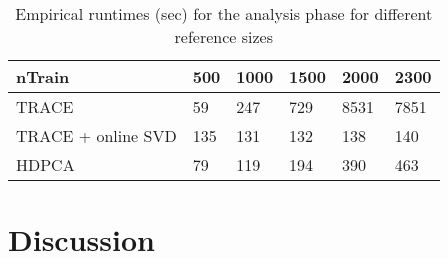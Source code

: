 \documentclass{article}[12pt]
\begin{document}
\begin{table} 
  \centering
  \begin{tabular}{|l|l|l|l|l|l|}
    \hline
    nTrain & 500 & 1000 & 1500 & 2000 & 2300 \\ 
    \hline
    TRACE & 59 & 247 & 729 & 8531 & 7851 \\
    \hline
    TRACE + online SVD & 135 & 131 & 132 & 138 & 140 \\
    \hline
    HDPCA & 79 & 119 & 194 & 390 & 463 \\
    \hline
  \end{tabular}
  \caption{Empirical runtimes (sec) for the analysis phase for different reference sizes}
  \label{tbl:runAna}
\end{table}



\section{Discussion}
\end{document}

